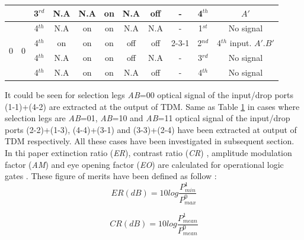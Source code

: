 \documentclass{osa-article}
\begin{document}
\begin{table}[H]
{\begin{tabular}{c|c|c|c|c|c|c|c|c|c|c}
\cline{3-11}
& & 3$^{rd}$& N.A& N.A& on& N.A& off& -& 4$^{th}$& $A'$\\
\hline 
\multirow{4}{*}{0}& \multirow{4}{*}{0}& 4$^{th}$& N.A& on& on& N.A& N.A&-& 1$^{st}$& No signal\\
\cline{3-11}
& & 4$^{th}$& on& on& on& off& off& 2-3-1& 2$^{nd}$&4$^{th}$ input. $A'$.$B'$\\
\cline{3-11}
& & 4$^{th}$& N.A& on& on& off& N.A& -& 3$^{rd}$& No signal\\ 
\cline{3-11}
& & 4$^{th}$& N.A& on& on& N.A& off& -& 4$^{th}$& No signal\\
\hline 
\end{tabular}
}
\label{tab2} %
\end{table}

It could be seen for selection legs \textit{A}\textit{B}=00 optical signal of the input/drop ports (1-1)+(4-2) are extracted at the output of TDM. Same as Table \ref{tab2} in cases where selection legs are  \textit{A}\textit{B}=01,  \textit{A}\textit{B}=10 and  \textit{A}\textit{B}=11 optical signal of the input/drop ports (2-2)+(1-3), (4-4)+(3-1) and (3-3)+(2-4) have been extracted at output of TDM respectively. All these cases have been investigated in subsequent section.\\
In thi paper extinction ratio (\textit {ER}), contrast ratio (\textit {CR}) , amplitude modulation factor (\textit {AM}) and eye opening factor (\textit {EO}) are calculated for operational logic gates \cite{houbavlis2004performance}. These figure of merits have been defined as follow :
\begin{equation}
ER(dB)=10log\frac{P^1_{min}} {P^0_{max}}
\label{eq:1}
\end{equation}

 \begin{equation}
CR(dB)=10log\frac{P^1_{mean}} {P^0_{mean}}
\label{eq:2}
\end{equation}
\end{document}
